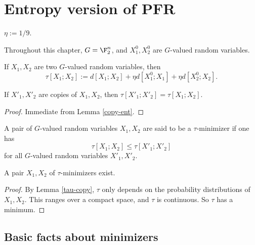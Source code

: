 \chapter{Entropy version of PFR}

\begin{definition}\label{eta-def}
 \leanok
  $\eta := 1/9$.
\end{definition}

Throughout this chapter,  $G = \F_2^n$, and $X^0_1, X^0_2$ are $G$-valued random variables.

\begin{definition}\label{tau-def}
  \leanok
If $X_1,X_2$ are two $G$-valued random variables, then
$$  \tau[X_1; X_2] := d[X_1; X_2] + \eta  d[X^0_1; X_1] + \eta d[X^0_2; X_2].$$
\end{definition}

\begin{lemma}\label{tau-copy}\leanok
    If $X'_1, X'_2$ are copies of $X_1,X_2$, then $\tau[X'_1;X'_2] = \tau[X_1;X_2]$.
\end{lemma}


\begin{proof}\leanok Immediate from Lemma \ref{copy-ent}.
\end{proof}

\begin{definition}\label{tau-min-def}
\leanok
A pair of $G$-valued random variables $X_1, X_2$ are said to be a $\tau$-minimizer if one has
  $$\tau[X_1;X_2] \leq \tau[X'_1;X'_2]
  $$
for all $G$-valued random variables $X'_1, X'_2$.
\end{definition}


\begin{proposition}\label{tau-min}
  \leanok
A pair $X_1, X_2$ of $\tau$-minimizers exist.
\end{proposition}

\begin{proof}\leanok By Lemma \ref{tau-copy}, $\tau$ only depends on the probability distributions of $X_1, X_2$. This ranges over a compact space, and $\tau$ is continuous.  So $\tau$ has a minimum.
\end{proof}

\section{Basic facts about minimizers}

